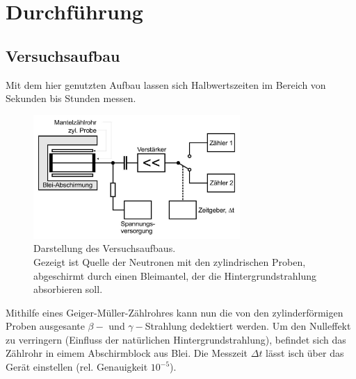 \newpage
\section{Durchführung}
\label{sec:Durchfuehrung}
\subsection{Versuchsaufbau}
Mit dem hier genutzten Aufbau lassen sich Halbwertszeiten im Bereich von Sekunden bis Stunden messen.
\begin{figure}
    \centering
    \includegraphics[width=0.7\textwidth]{bilder/Versuchsaufbau.jpg}
    \caption{Darstellung des Versuchsaufbaus.\\
    Gezeigt ist Quelle der Neutronen mit den zylindrischen Proben, abgeschirmt durch einen Bleimantel,
    der die Hintergrundstrahlung absorbieren soll.\cite[217]{anleitung}}
\end{figure}

Mithilfe eines Geiger-Müller-Zählrohres kann nun die von den zylinderförmigen Proben 
ausgesante $\beta-$ und $\gamma-$Strahlung dedektiert werden. 
Um den Nulleffekt zu verringern (Einfluss der natürlichen Hintergrundstrahlung),
befindet sich das Zählrohr in eimem Abschirmblock aus Blei.
Die Messzeit $\Delta t$ lässt isch über das Gerät einstellen (rel. Genauigkeit $10^{-5}$).
